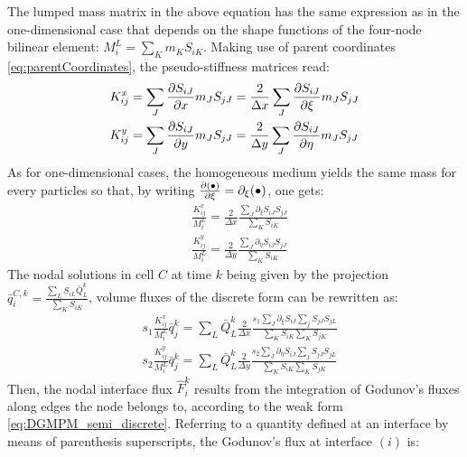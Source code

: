 The lumped mass matrix in the above equation has the same expression as in the one-dimensional case that depends on the shape functions of the four-node bilinear element: $M_i^L=\sum_K m_K S_{iK}$.
Making use of parent coordinates \eqref{eq:parentCoordinates}, the pseudo-stiffness matrices read:
\begin{equation}
  \begin{aligned}
    & K_{ij}^x = \sum_J \frac{\partial S_{iJ}}{\partial x}m_J S_{jJ}=\frac{2}{\Delta x}\sum_J\frac{\partial S_{iJ}}{\partial \xi}m_J S_{jJ} \\
    &K_{ij}^y = \sum_J\frac{\partial S_{iJ}}{\partial y}m_J S_{jJ}=\frac{2}{\Delta y}\sum_J\frac{\partial S_{iJ}}{\partial \eta}m_J S_{jJ} \\
  \end{aligned}
\end{equation}
As for one-dimensional cases, the homogeneous medium yields the same mass for every particles so that, by writing $\frac{\partial (\bullet)}{\partial \xi}=\partial_\xi(\bullet)$, one gets:
\begin{equation}
  \label{eq:2Dpseudo_stiffness}
  \begin{aligned}
    & \frac{K_{ij}^x}{M_i^L}  =  \frac{2}{\Delta x} \frac{\sum_J\partial_\xi S_{iJ}  S_{jJ}}{\sum_K  S_{iK}} \\
    & \frac{K_{ij}^y}{M_i^L} = \frac{2}{\Delta y} \frac{\sum_J\partial_\eta S_{iJ} S_{jJ}}{\sum_K S_{iK}}
  \end{aligned}
\end{equation}
The nodal solutions in cell $C$ at time $k$ being given by the projection $\bar{q}^{C,k}_i=\frac{\sum_L S_{iL}\bar{Q}^k_L}{\sum_K S_{iK}}$, volume fluxes of the discrete form can be rewritten as:
\begin{equation}
  \label{eq:2Dvolume_fluxes}
  \begin{aligned}
    & s_1\frac{K_{ij}^x}{M_i^L}\bar{q}^k_j  = \sum_L\bar{Q}^k_L\frac{2}{\Delta x} \frac{s_1\sum_J\partial_\xi S_{iJ}  \sum_j S_{jJ} S_{jL}}{\sum_K S_{iK}\sum_K S_{jK}}\\
    & s_2\frac{K_{ij}^y}{M_i^L}\bar{q}^k_j = \sum_L \bar{Q}^k_L\frac{2}{\Delta y}  \frac{s_2 \sum_J\partial_\eta S_{iJ}  \sum_j S_{jJ} S_{jL}}{\sum_K  S_{iK}\sum_K S_{jK}}
  \end{aligned}
\end{equation}
Then, the nodal interface flux $\hat{F}^k_i$ results from the integration of Godunov's fluxes along edges the node belongs to, according to the weak form \eqref{eq:DGMPM_semi_discrete}.
Referring to a quantity defined at an interface by means of parenthesis superscripts, the Godunov's flux at interface $(i)$ is:
